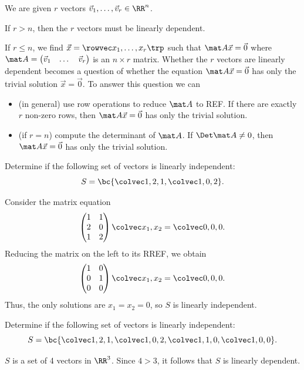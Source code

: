 \begin{recipe}
    We are given $r$ vectors $\vec v_1, \dots, \vec v_r \in \RR^n$.

     If $r > n$, then the $r$ vectors must be linearly dependent.
    
     If $r \leq n$, we find $\vec x = \cveciiix{x_1}{\dots}{x_r}$ such that $\mat A \vec x = \vec 0$ where $\mat A = \begin{pmatrix}\vec v_1 & \dots & \vec v_r\end{pmatrix}$ is an $n \times r$ matrix. Whether the $r$ vectors are linearly dependent becomes a question of whether the equation $\mat A \vec x = \vec 0$ has only the trivial solution $\vec x = \vec 0$. To answer this question we can
    \begin{itemize}
        \item (in general) use row operations to reduce $\mat A$ to REF. If there are exactly $r$ non-zero rows, then $\mat A \vec x = \vec 0$ has only the trivial solution.
        \item (if $r = n$) compute the determinant of $\mat A$. If $\Det \mat A \neq 0$, then $\mat A \vec x = \vec 0$ has only the trivial solution.
    \end{itemize}
\end{recipe}

\begin{sample}
    Determine if the following set of vectors is linearly independent: \[S = \bc{\cveciii121, \cveciii102}.\]
\end{sample}
\begin{sampans}
    Consider the matrix equation \[\begin{pmatrix}1 & 1 \\ 2 & 0 \\ 1 & 2 \end{pmatrix} \cvecii{x_1}{x_2} = \cveciii000.\] Reducing the matrix on the left to its RREF, we obtain \[\begin{pmatrix}1 & 0 \\ 0 & 1 \\ 0 & 0 \end{pmatrix} \cvecii{x_1}{x_2} = \cveciii000.\] Thus, the only solutions are $x_1 = x_2 = 0$, so $S$ is linearly independent.
\end{sampans}

\begin{sample}
    Determine if the following set of vectors is linearly independent: \[S = \bc{\cveciii121, \cveciii102, \cveciii110, \cveciii100}.\]
\end{sample}
\begin{sampans}
    $S$ is a set of 4 vectors in $\RR^3$. Since $4 > 3$, it follows that $S$ is linearly dependent.
\end{sampans}

